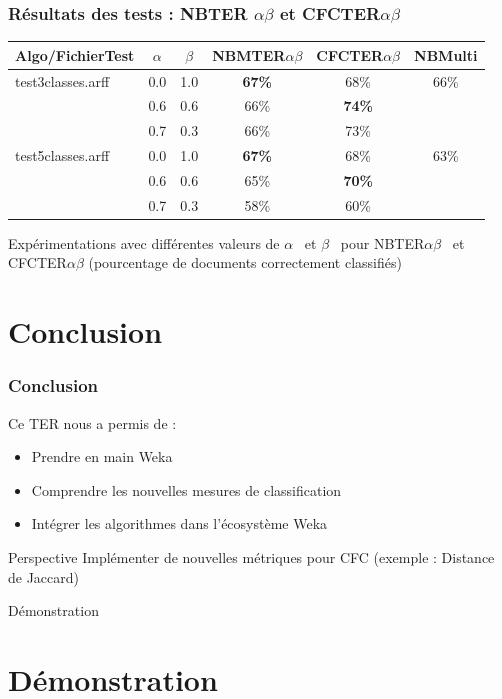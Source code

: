 \documentclass[12pt]{beamer}
\begin{document}
\begin{frame}
\frametitle{Résultats des tests : NBTER $\alpha\beta$ et CFCTER$\alpha\beta$ }
\begin{footnotesize}



\begin{table}


    \begin{tabular}{|l|c|c|c|c||c|}
\hline
 Algo/FichierTest & $\alpha$ & $\beta$ & NBMTER$\alpha\beta$ & CFCTER$\alpha\beta$ & NBMulti \\
    \hline
    test3classes.arff &  0.0 &  1.0& \textbf{67\%} & 68\% & 66\% \\
    \cline{2-5}
         ~ &   0.6  &  0.6 & 66\% & \textbf{74\%} & ~\\
         \cline{2-5}
         ~ &   0.7  &  0.3 & 66\% & 73\% & ~\\
    \hline
     test5classes.arff &  0.0 &  1.0& \textbf{67\%} &68\% & 63\% \\
    \cline{2-5}
         ~ &   0.6  &  0.6 & 65\% & \textbf{70\%} & ~\\
         \cline{2-5}
         ~ &   0.7  &  0.3 & 58\% & 60\% & ~\\
    \hline
    \end{tabular}
\end{table}
\end{footnotesize}
\medskip
Expérimentations avec différentes valeurs de $\alpha$  \ et $\beta$ \  pour NBTER$\alpha\beta$ \ et CFCTER$\alpha\beta$ (pourcentage de documents correctement classifiés)
\end{frame}



\section{Conclusion}
\begin{frame}
\frametitle{Conclusion}
Ce TER nous a permis de :
\begin{itemize}
\item Prendre en main  Weka 
\item Comprendre les nouvelles mesures de classification
\item Intégrer les algorithmes dans l’écosystème Weka 
\end{itemize}
\begin{block}{Perspective}
Implémenter de nouvelles métriques pour CFC (exemple : Distance de Jaccard)
\end{block}

\end{frame}
\begin{frame}

\begin{center}
\huge Démonstration

\end{center}
\end{frame}
\section{Démonstration}
\end{document}
